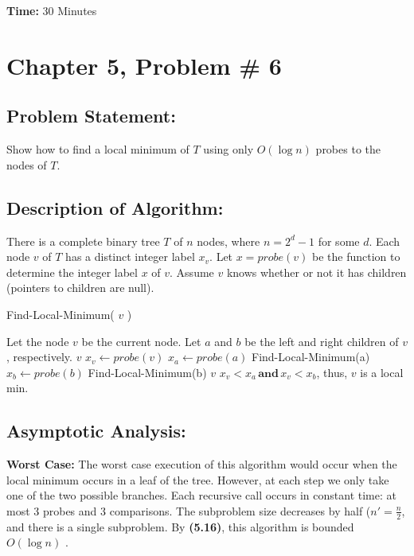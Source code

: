 \documentclass{article}
\begin{document}
\noindent \textbf{Time:}  30 Minutes

\newpage
\section*{Chapter 5, Problem \# 6}
\subsection*{Problem Statement:}
Show how to find a local minimum of $T$ using only $O(\log{n})$ probes to the nodes of $T$.

\subsection*{Description of Algorithm:}
There is a complete binary tree $T$ of $n$ nodes, where $n = 2^d - 1$ for some $d$.  Each node $v$ of $T$ has a distinct integer label $x_v$.  Let $x = probe(v)$ be the function to determine the integer label $x$ of $v$.  Assume $v$ knows whether or not it has children (pointers to children are null).

\begin{algorithm} %
\caption{Find-Local-Minimum( $v$ )} %
\label{alg3} %
\begin{algorithmic} %
    \State Let the node $v$ be the current node. 
    \State Let $a$ and $b$ be the left and right children of $v$, respectively.  
		\State \Return $v$
	\EndIf
	\State $x_v \gets probe(v)$
	\State $x_a \gets probe(a)$
		\State Find-Local-Minimum(a)
	\Else
		\State $x_b \gets probe(b)$
			\State Find-Local-Minimum(b)
		\Else
			\State \Return $v$
			\Comment $x_v < x_a \, \mathbf{and} \, x_v < x_b$, thus, $v$ is a local min. 
		\EndIf
	\EndIf
\end{algorithmic}
\end{algorithm}

\subsection*{Asymptotic Analysis:}
\noindent \textbf{Worst Case:}
The worst case execution of this algorithm would occur when the local minimum occurs in a leaf of the tree.  However, at each step we only take one of the two possible branches.  Each recursive call occurs in constant time:  at most 3 probes and 3 comparisons.  The subproblem size decreases by half ($n' = \frac{n}{2}$, and there is a single subproblem.
By \textbf{(5.16)}, this algorithm is bounded $O(\log{n})$ \cite{algDesign}.
\end{document}
